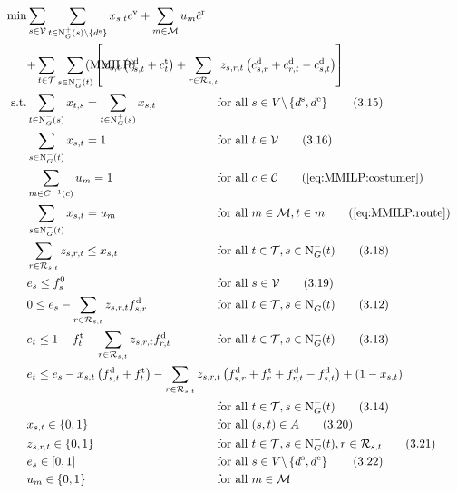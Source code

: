 \begin{align}
	\min & \sum_{s\in\mathcal{V}} \sum_{t\in\Nout(s)\backslash\{d^{\operatorname{e}}\}} x_{s,t}\cv + \sum_{m\in\mathcal{M}} u_m\hat{c}^{\operatorname{r}} \nonumber \\
	& \omit\rlap{$\displaystyle{ + \sum_{t\in\mathcal{T}} \sum_{s\in\Nin(t)} \left[x_{s,t}\left(\cd_{s,t}+\ct_{t}\right) + \sum_{r\in\Rst} z_{s,r,t}\left(\cd_{s,r}+\cd_{r,t}-\cd_{s,t}\right)\right]}$} \tag{MMILP} \label{eq:MMILP} \\
	\text{s.t.} & \sum_{t\in\Nin(s)} x_{t,s} = \sum_{t\in\Nout(s)} x_{s,t} & & \text{for all } s\in V\backslash\left\{d^{\operatorname{s}},d^{\operatorname{e}}\right\} \tag{3.15} \\
	& \sum_{s\in\Nin(t)} x_{s,t} = 1 & & \text{for all } t\in\mathcal{V} \tag{3.16} \\
	& \sum_{m\in C^{-1}(c)} u_m = 1 && \text{for all } c\in\mathcal{C} \tag{\ref{eq:MMILP:costumer}} \\
	& \sum_{s\in\Nin(t)} x_{s,t} = u_m && \text{for all } m\in\mathcal{M}, t\in m \tag{\ref{eq:MMILP:route}} \\
	& \sum_{r\in\Rst} z_{s,r,t} \leq x_{s,t} & & \text{for all } t\in\mathcal{T}, s\in\Nin(t) \tag{3.18} \\
	& e_s \leq f_s^0 & & \text{for all } s\in\mathcal{V} \tag{3.19} \\
	& 0 \leq e_s - \sum_{r\in\Rst} z_{s,r,t}\fd_{s,r} & & \text{for all } t\in\mathcal{T}, s\in\Nin(t) \tag{3.12} \\
	& e_t \leq 1 - \ft_t - \sum_{r\in\Rst} z_{s,r,t}\fd_{r,t} & & \text{for all } t\in\mathcal{T}, s\in\Nin(t) \tag{3.13} \\
	& \omit\rlap{$\displaystyle{e_t \leq e_s - x_{s,t}\left(f_{s,t}^{\operatorname{d}}+f_t^{\operatorname{t}}\right) - \sum_{r\in\Rst} z_{s,r,t}\left(\fd_{s,r}+\ft_r+\fd_{r,t}-\fd_{s,t}\right) + \left(1-x_{s,t}\right)}$} \nonumber \\
	& & & \text{for all } t\in\mathcal{T}, s\in\Nin(t) \tag{3.14} \\
	& x_{s,t}\in\{0,1\} & & \text{for all } (s,t)\in A \tag{3.20} \\
	& z_{s,r,t}\in\{0,1\} & & \text{for all } t\in\mathcal{T},s\in\Nin(t),r\in\Rst \tag{3.21} \\
	& e_s\in[0,1] & & \text{for all } s\in V\backslash\left\{d^{\operatorname{s}},d^{\operatorname{e}}\right\} \tag{3.22} \\
	& u_m\in\{0,1\} && \text{for all } m\in\mathcal{M}
\end{align}